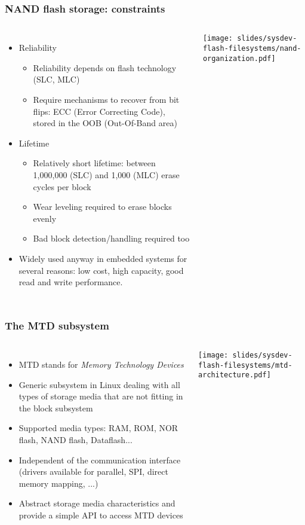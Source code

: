 \begin{frame}[fragile]
  \frametitle{NAND flash storage: constraints}
  \begin{columns}[T]
  \small
  \small
  \begin{itemize}
  \item Reliability
    \begin{itemize}
    \item Reliability depends on flash technology (SLC, MLC)
    \item Require mechanisms to recover from bit flips: ECC (Error
          Correcting Code), stored in the OOB (Out-Of-Band area)
    \end{itemize}
  \item Lifetime
    \begin{itemize}
    \item Relatively short lifetime: between 1,000,000 (SLC) and 1,000
          (MLC) erase cycles per block
    \item Wear leveling required to erase blocks evenly
    \item Bad block detection/handling required too
    \end{itemize}
  \item Widely used anyway in embedded systems for several reasons:
        low cost, high capacity, good read and write performance.
  \end{itemize}
  \texttt{[image: slides/sysdev-flash-filesystems/nand-organization.pdf]}
  \end{columns}
\end{frame}

\begin{frame}
  \frametitle{The MTD subsystem}
  \begin{columns}[T]
  \begin{itemize}
  \item MTD stands for {\em Memory Technology Devices}
  \item Generic subsystem in Linux dealing with all types of storage media that
        are not fitting in the block subsystem
  \item Supported media types: RAM, ROM, NOR flash, NAND flash,
        Dataflash...
  \item Independent of the communication interface (drivers available
        for parallel, SPI, direct memory mapping, ...)
  \item Abstract storage media characteristics and provide a simple
        API to access MTD devices
  \end{itemize}
    \texttt{[image: slides/sysdev-flash-filesystems/mtd-architecture.pdf]}
  \end{columns}
\end{frame}

